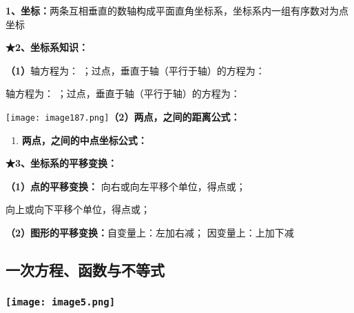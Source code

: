 \textbf{1、坐标：}两条互相垂直的数轴构成平面直角坐标系，坐标系内一组有序数对为点坐标

\textbf{★2、坐标系知识：}

\textbf{（1）}轴方程为： ；过点，垂直于轴（平行于轴）的方程为：

轴方程为： ；过点，垂直于轴（平行于轴）的方程为：

\texttt{[image: image187.png]}\textbf{（2）两点，之间的距离公式：}

\begin{enumerate}
\def\labelenumi{\arabic{enumi}.}
\setcounter{enumi}{2}
\item
  \textbf{两点，之间的中点坐标公式：}
\end{enumerate}

\textbf{★3、坐标系的平移变换：}

\textbf{（1）点的平移变换：} 向右或向左平移个单位，得点或；

向上或向下平移个单位，得点或；

\textbf{（2）图形的平移变换：}自变量上：左加右减； 因变量上：上加下减

\hypertarget{ux4e00ux6b21ux65b9ux7a0bux51fdux6570ux4e0eux4e0dux7b49ux5f0f}{%
\subsection{\texorpdfstring{
一次方程、函数与不等式}{ 一次方程、函数与不等式}}\label{ux4e00ux6b21ux65b9ux7a0bux51fdux6570ux4e0eux4e0dux7b49ux5f0f}}

\hypertarget{ux5b66ux79d1ux7f51www.zxxk.com--ux6559ux80b2ux8d44ux6e90ux95e8ux6237ux63d0ux4f9bux8bd5ux9898ux8bd5ux5377ux6559ux6848ux8bfeux4ef6ux6559ux5b66ux8bbaux6587ux7d20ux6750ux7b49ux5404ux7c7bux6559ux5b66ux8d44ux6e90ux5e93ux4e0bux8f7dux8fd8ux6709ux5927ux91cfux4e30ux5bccux7684ux6559ux5b66ux8d44ux8baf-31}{%
\subsubsection{\texorpdfstring{\protect\texttt{[image: image5.png]}}{学科网(www.zxxk.com)-\/-教育资源门户，提供试题试卷、教案、课件、教学论文、素材等各类教学资源库下载，还有大量丰富的教学资讯！}}\label{ux5b66ux79d1ux7f51www.zxxk.com--ux6559ux80b2ux8d44ux6e90ux95e8ux6237ux63d0ux4f9bux8bd5ux9898ux8bd5ux5377ux6559ux6848ux8bfeux4ef6ux6559ux5b66ux8bbaux6587ux7d20ux6750ux7b49ux5404ux7c7bux6559ux5b66ux8d44ux6e90ux5e93ux4e0bux8f7dux8fd8ux6709ux5927ux91cfux4e30ux5bccux7684ux6559ux5b66ux8d44ux8baf-31}}

